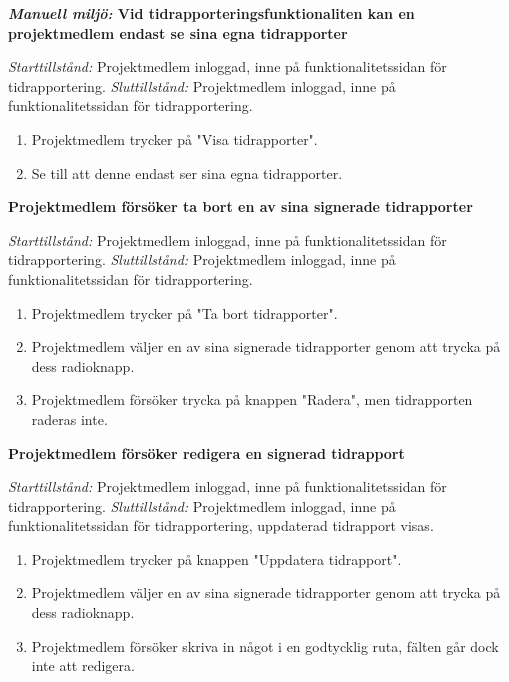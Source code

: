 \documentclass[a4paper]{article}
\begin{document}
\begin{FT}
\item
\textbf{\emph{Manuell miljö:} Vid tidrapporteringsfunktionaliten kan en projektmedlem endast se sina egna tidrapporter} 

\emph{Starttillstånd:} Projektmedlem inloggad, inne på funktionalitetssidan för tidrapportering.
\emph{Sluttillstånd:} Projektmedlem inloggad, inne på funktionalitetssidan för tidrapportering.

\begin{enumerate}
\item Projektmedlem trycker på "Visa tidrapporter".
\item Se till att denne endast ser sina egna tidrapporter.
\end{enumerate}


\item
\textbf{Projektmedlem försöker ta bort en av sina signerade tidrapporter}

\emph{Starttillstånd:} Projektmedlem inloggad, inne på funktionalitetssidan för tidrapportering.
\emph{Sluttillstånd:} Projektmedlem inloggad, inne på funktionalitetssidan för tidrapportering.

\begin{enumerate}
\item Projektmedlem trycker på "Ta bort tidrapporter".
\item Projektmedlem väljer en av sina signerade tidrapporter genom att trycka på dess radioknapp.
\item Projektmedlem försöker trycka på knappen "Radera", men tidrapporten raderas inte.
\end{enumerate}

\item
\textbf{Projektmedlem försöker redigera en signerad tidrapport}

\emph{Starttillstånd:} Projektmedlem inloggad, inne på funktionalitetssidan för tidrapportering.
\emph{Sluttillstånd:} Projektmedlem inloggad, inne på funktionalitetssidan för tidrapportering, uppdaterad tidrapport visas.

\begin{enumerate}
\item Projektmedlem trycker på knappen "Uppdatera tidrapport".
\item Projektmedlem väljer en av sina signerade tidrapporter genom att trycka på dess radioknapp.
\item Projektmedlem försöker skriva in något i en godtycklig ruta, fälten går dock inte att redigera.
\end{enumerate}



\end{FT}
\end{document}
